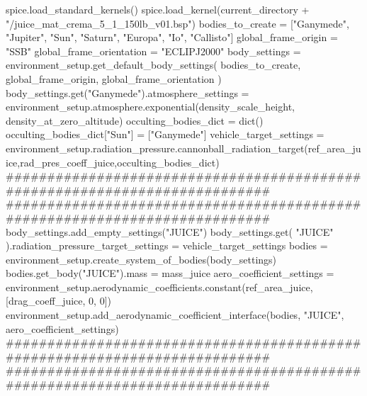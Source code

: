 {}
\markdownRendererSectionEnd \markdownRendererSectionBegin
{}\markdownRendererInterblockSeparator
{}spice.load_standard_kernels() spice.load_kernel(current_directory + "/juice_mat_crema_5_1_150lb_v01.bsp")\markdownRendererInterblockSeparator
{}
\markdownRendererSectionEnd \markdownRendererSectionBegin
{}\markdownRendererInterblockSeparator
{}bodies_to_create = ["Ganymede", "Jupiter", "Sun", "Saturn", "Europa", "Io", "Callisto"] global_frame_origin = "SSB" global_frame_orientation = "ECLIPJ2000" body_settings = environment_setup.get_default_body_settings( bodies_to_create, global_frame_origin, global_frame_orientation ) body_settings.get("Ganymede").atmosphere_settings = environment_setup.atmosphere.exponential(density_scale_height, density_at_zero_altitude) occulting_bodies_dict = dict() occulting_bodies_dict["Sun"] = ["Ganymede"] vehicle_target_settings = environment_setup.radiation_pressure.cannonball_radiation_target(ref_area_juice,rad_pres_coeff_juice,occulting_bodies_dict)\markdownRendererInterblockSeparator
{}###########################################################################\markdownRendererInterblockSeparator
{}
\markdownRendererSectionEnd \markdownRendererSectionBegin
{}\markdownRendererInterblockSeparator
{}########################################################################### body_settings.add_empty_settings("JUICE") body_settings.get( "JUICE" ).radiation_pressure_target_settings = vehicle_target_settings\markdownRendererInterblockSeparator
{}
\markdownRendererSectionEnd \markdownRendererSectionBegin
{}\markdownRendererInterblockSeparator
{}bodies = environment_setup.create_system_of_bodies(body_settings) bodies.get_body("JUICE").mass = mass_juice\markdownRendererInterblockSeparator
{}
\markdownRendererSectionEnd \markdownRendererSectionBegin
{}\markdownRendererInterblockSeparator
{}aero_coefficient_settings = environment_setup.aerodynamic_coefficients.constant(ref_area_juice, [drag_coeff_juice, 0, 0]) environment_setup.add_aerodynamic_coefficient_interface(bodies, "JUICE", aero_coefficient_settings)\markdownRendererInterblockSeparator
{}###########################################################################\markdownRendererInterblockSeparator
{}
\markdownRendererSectionEnd \markdownRendererSectionBegin
{}\markdownRendererInterblockSeparator
{}###########################################################################\markdownRendererInterblockSeparator
